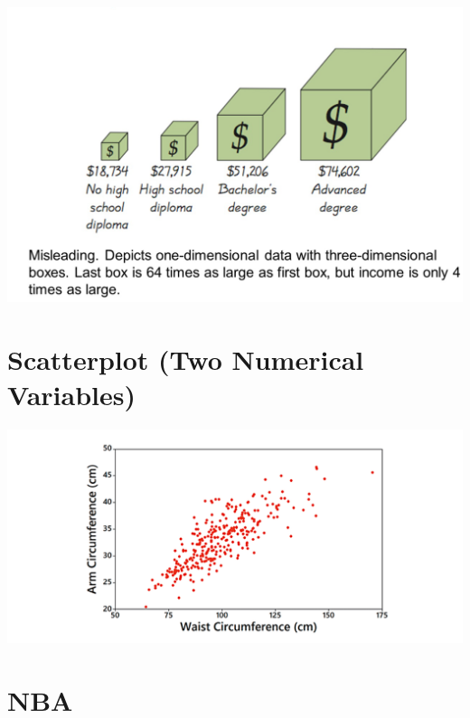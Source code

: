 \documentclass[]{book}
\begin{document}
\includegraphics{picto_wrong.png}

\hypertarget{scatterplot-two-numerical-variables}{%
\section{Scatterplot (Two Numerical Variables)}\label{scatterplot-two-numerical-variables}}

\includegraphics{scatter.png}

\hypertarget{nba}{%
\section{NBA}\label{nba}}
\end{document}
